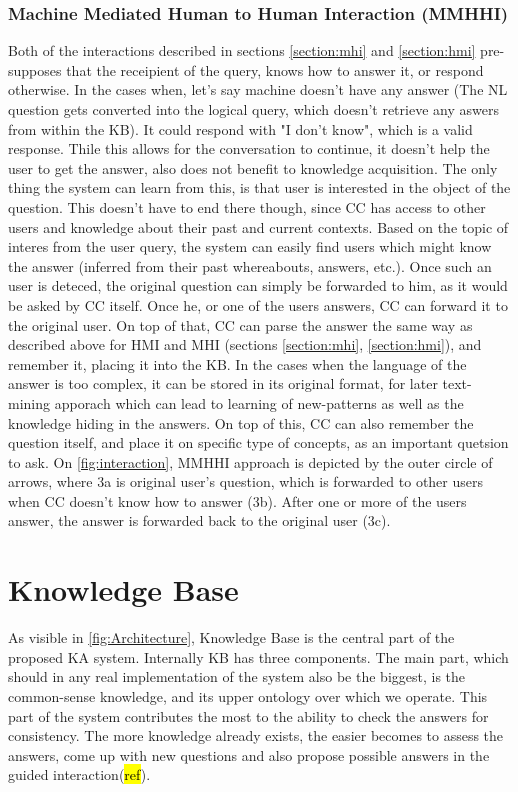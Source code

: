 \subsubsection{Machine Mediated Human to Human Interaction (MMHHI)}
\label{section:mmhhi}
Both of the interactions described in sections \ref{section:mhi} and 
\ref{section:hmi} pre-supposes that the receipient of the query, knows how to
answer it, or respond otherwise. In the cases when, let's say machine doesn't
have any answer (The NL question gets converted into the logical query, which doesn't retrieve any aswers from within the KB). It could respond with 
"I don't know", which is a valid response.
Thile this allows for the conversation to continue, it doesn't help the user
to get the answer, also does not benefit to knowledge acquisition. The only 
thing the system can learn from this, is that user is interested in the object
of the question. This doesn't have to end there though, since CC has access to
other users and knowledge about their past and current contexts. Based on the
topic of interes from the user query, the system can easily find users which
might know the answer (inferred from their past whereabouts, answers, etc.).
Once such an user is deteced, the original question can simply be forwarded to
him, as it would be asked by CC itself. Once he, or one of the users answers,
CC can forward it to the original user. On top of that, CC can parse the answer
the same way as described above for HMI and MHI (sections \ref{section:mhi},
\ref{section:hmi}), and remember it, placing it into the KB. In the cases when
the language of the answer is too complex, it can be stored in its original
format, for later text-mining apporach which can lead to learning of new-patterns
as well as the knowledge hiding in the answers. On top of this, CC can also
remember the question itself, and place it on specific type of concepts, as an
important quetsion to ask. On \autoref{fig:interaction},
MMHHI approach is depicted by the outer circle of arrows, where 3a is original 
user's question, which is forwarded to other users when CC doesn't know how to 
answer (3b). After one or more of the users answer, the answer is forwarded back
to the original user (3c).

\section{Knowledge Base}
\label{section:kb}
As visible in \autoref{fig:Architecture}, Knowledge Base is the central part
of the proposed KA system. Internally KB has three components. The main part, 
which should in any real implementation of the system also be the biggest, is 
the common-sense knowledge, and its upper ontology over which we operate. 
This part of the system contributes the most to the ability to check the 
answers for consistency. The more knowledge already exists, the easier becomes 
to assess the answers, come up with new questions and also propose possible
answers in the guided interaction(\hl{ref}).

